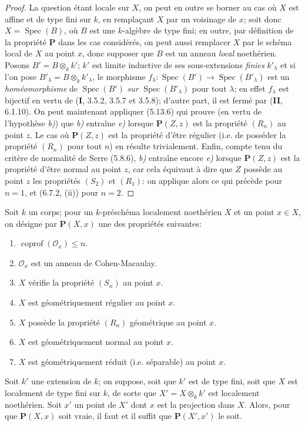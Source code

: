 \begin{proof}
La question étant locale sur $X$, on peut en outre se borner au cas où $X$
est affine et de type fini sur $k$, en remplaçant $X$ par un voisinage de $x$;
soit donc $X=\operatorname{Spec}(B)$, où $B$ est une $k$-algèbre de type fini;
en outre, par définition de la propriété $\boldsymbol{P}$ dans les cas considérés, on peut
aussi remplacer $X$ par le schéma local de $X$ au point $x$, donc supposer que
$B$ est un anneau \emph{local} noethérien. Posons $B'=B\otimes_k k'$; $k'$ est
limite inductive de ses sous-extensions \emph{finies} $k'_\lambda$ et si l'on pose
$B'_\lambda=B\otimes_k k'_\lambda$, le morphisme
$f_\lambda:\operatorname{Spec}(B')\to\operatorname{Spec}(B'_\lambda)$ est
un \emph{homéomorphisme} de $\operatorname{Spec}(B')$ \emph{sur}
$\operatorname{Spec}(B'_\lambda)$ pour tout $\lambda$;
en effet $f_\lambda$ est bijectif en vertu de (\textbf{I}, 3.5.2, 3.5.7 et 3.5.8);
d'autre part, il est fermé par (\textbf{II}, 6.1.10). On peut maintenant appliquer
(5.13.6) qui prouve (en vertu de l'hypothèse \emph{b)}) que \emph{b)} entraîne \emph{e)} lorsque
$\boldsymbol{P}(Z,z)$ est la propriété $(R_n)$ au point $z$. Le cas où $\boldsymbol{P}(Z,z)$ est la
propriété d'être régulier (i.e. de posséder la propriété $(R_n)$ pour tout $n$)
en résulte trivialement. Enfin, compte tenu du critère de normalité de Serre
(5.8.6), \emph{b)} entraîne encore \emph{e)} lorsque $\boldsymbol{P}(Z,z)$ est la propriété d'être normal
au point $z$, car cela équivaut à dire que $Z$ possède au point $z$ les
propriétés $(S_2)$ et $(R_1)$: on applique alors ce qui précède pour $n=1$,
et (6.7.2, (ii)) pour $n=2$.
\end{proof}

\begin{corollary}[6.7.8]
\label{IV.2.s6.7.8-fr}
Soit $k$ un corps; pour un $k$-préschéma localement noethérien $X$ et un
point $x\in X$, on désigne par $\boldsymbol{P}(X,x)$ une des propriétés suivantes:
\begin{enumerate}
\item[\textup{(i)}] $\operatorname{coprof}(\mathcal O_x)\leq n$.
\item[\textup{(ii)}] $\mathcal O_x$ est un anneau de Cohen-Macaulay.
\item[\textup{(iii)}] $X$ vérifie la propriété $(S_n)$ au point $x$.
\item[\textup{(iv)}] $X$ est géométriquement régulier au point $x$.
\item[\textup{(v)}] $X$ possède la propriété $(R_n)$ géométrique au point $x$.
\item[\textup{(vi)}] $X$ est géométriquement normal au point $x$.
\item[\textup{(vii)}] $X$ est géométriquement réduit (\textup{i.e.} séparable) au point $x$.
\end{enumerate}

Soit $k'$ une extension de $k$; on suppose, soit que $k'$ est de type fini,
soit que $X$ est localement de type fini sur $k$, de sorte que
$X'=X\otimes_k k'$ est localement noethérien. Soit $x'$ un point de $X'$ dont
$x$ est la projection dans $X$. Alors, pour que $\boldsymbol{P}(X,x)$ soit vraie, il faut
et il suffit que $\boldsymbol{P}(X',x')$ le soit.
\end{corollary}

